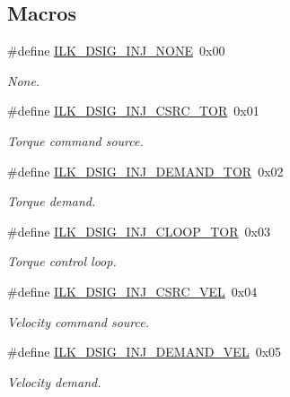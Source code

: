 \subsection*{Macros}
\begin{DoxyCompactItemize}
\item 
\#define \hyperlink{group__IL__CONST__DSIG__INJ_ga2a8188af50a070b8d706ec993e2e288c}{I\+L\+K\+\_\+\+D\+S\+I\+G\+\_\+\+I\+N\+J\+\_\+\+N\+O\+NE}~0x00
\begin{DoxyCompactList}\small\item\em None. \end{DoxyCompactList}\item 
\#define \hyperlink{group__IL__CONST__DSIG__INJ_gaa2f0c5ecb182317e3882918acc628cd4}{I\+L\+K\+\_\+\+D\+S\+I\+G\+\_\+\+I\+N\+J\+\_\+\+C\+S\+R\+C\+\_\+\+T\+OR}~0x01
\begin{DoxyCompactList}\small\item\em Torque command source. \end{DoxyCompactList}\item 
\#define \hyperlink{group__IL__CONST__DSIG__INJ_ga0d2db20d760c659401d8168710efe721}{I\+L\+K\+\_\+\+D\+S\+I\+G\+\_\+\+I\+N\+J\+\_\+\+D\+E\+M\+A\+N\+D\+\_\+\+T\+OR}~0x02
\begin{DoxyCompactList}\small\item\em Torque demand. \end{DoxyCompactList}\item 
\#define \hyperlink{group__IL__CONST__DSIG__INJ_ga91ffd66b7114fd2f772768a9658d6eaa}{I\+L\+K\+\_\+\+D\+S\+I\+G\+\_\+\+I\+N\+J\+\_\+\+C\+L\+O\+O\+P\+\_\+\+T\+OR}~0x03
\begin{DoxyCompactList}\small\item\em Torque control loop. \end{DoxyCompactList}\item 
\#define \hyperlink{group__IL__CONST__DSIG__INJ_ga782af9a5787a2b7d32cce3e5f57d76a7}{I\+L\+K\+\_\+\+D\+S\+I\+G\+\_\+\+I\+N\+J\+\_\+\+C\+S\+R\+C\+\_\+\+V\+EL}~0x04
\begin{DoxyCompactList}\small\item\em Velocity command source. \end{DoxyCompactList}\item 
\#define \hyperlink{group__IL__CONST__DSIG__INJ_ga181b0771be1a6a7989ab5dcf16a62922}{I\+L\+K\+\_\+\+D\+S\+I\+G\+\_\+\+I\+N\+J\+\_\+\+D\+E\+M\+A\+N\+D\+\_\+\+V\+EL}~0x05
\begin{DoxyCompactList}\small\item\em Velocity demand. \end{DoxyCompactList}\item 

\end{DoxyCompactItemize}
